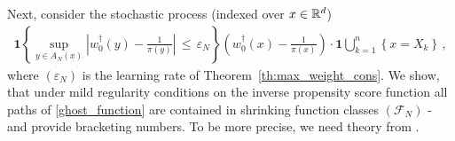 Next, consider the stochastic process (indexed over $x\in\mathbb{R}^d$)
\begin{gather}
  \label{ghost_function}
  \mathbf{1}{
    \left\{ 
      \sup_{y\in A_N(x)}
      \left| 
      w_0^\dagger(y)
      -
      \frac{1}{\pi(y)}
      \right|
      \,
      \le
      \,
      \varepsilon_N
    \right\}
  }
  \left( 
    w_0^\dagger(x)
      -
      \frac{1}{\pi(x)}
  \right)
  \cdot
  \mathbf{1}
  \bigcup_{k=1}^n
  \left\{ 
    x=X_k
  \right\}
  \,,
\end{gather}
where $(\varepsilon_N)$ is the learning rate of Theorem~\ref{th:max_weight_cons}.
We show, 
that under mild regularity conditions on the inverse propensity score function all paths of \eqref{ghost_function} are contained in shrinking function classes $(\mathcal{F}_N)$ - and provide bracketing numbers. 
To be more precise, we need theory from \cite[§2.7.1]{vaart2013}.

